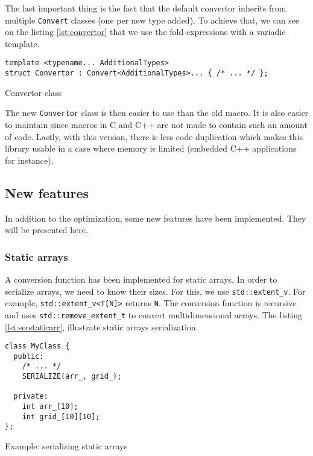 The last important thing is the fact that the default convertor inherits from
multiple \texttt{Convert} classes (one per new type added). To achieve that, we
can see on the listing \ref{lst:convertor} that we use the fold expressions with
a variadic template.

\begin{listing}[ht!]
\begin{verbatim}
template <typename... AdditionalTypes>
struct Convertor : Convert<AdditionalTypes>... { /* ... */ };
\end{verbatim}
\caption{Convertor class}
\label{lst:convertor}
\end{listing}

The new \texttt{Convertor} class is then easier to use than the old macro. It
is also easier to maintain since macros in C and C++ are not made to contain
such an amount of code. Lastly, with this version, there is less code
duplication which makes this library usable in a case where memory is limited
(embedded C++ applications for instance).

\subsection{New features}

In addition to the optimization, some new features have been implemented. They
will be presented here.

\subsubsection{Static arrays}

A conversion function has been implemented for static arrays. In order to
serialize arrays, we need to know their sizes. For this, we use
\texttt{std::extent\_v}. For example, \texttt{std::extent\_v<T[N]>} returns
\texttt{N}. The conversion function is recursive and uses
\texttt{std::remove\_extent\_t} to convert multidimensional arrays. The listing
\ref{lst:serstaticarr}, illustrate static arrays serialization.

\begin{listing}[ht!]
\begin{verbatim}
class MyClass {
  public:
    /* ... */
    SERIALIZE(arr_, grid_);

  private:
    int arr_[10];
    int grid_[10][10];
};
\end{verbatim}
\caption{Example: serializing static arrays}
\label{lst:serstaticarr}
\end{listing}

